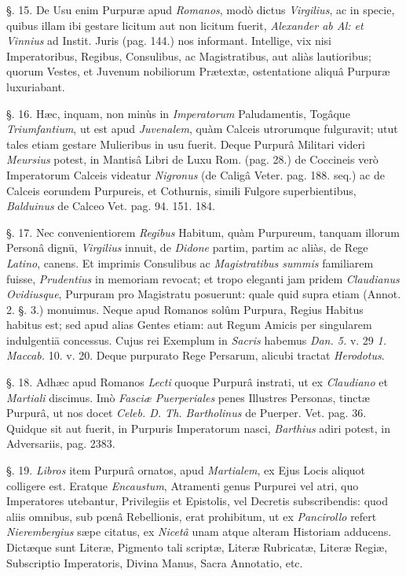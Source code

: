 \documentclass[a4paper, 11pt, oneside, polutonikogreek, german]{article}
\begin{document}
§. 15. De Usu enim Purpuræ apud \emph{Romanos}, modò dictus \emph{Virgilius}, ac in specie, quibus illam ibi gestare licitum aut non licitum fuerit, \emph{Alexander ab Al: et Vinnius} ad Instit. Juris (pag. 144.) nos informant. Intellige, vix nisi Imperatoribus, Regibus, Consulibus, ac Magistratibus, aut aliàs lautioribus; quorum Vestes, et Juvenum nobiliorum Prætextæ, ostentatione aliquâ Purpuræ luxuriabant.

§. 16. Hæc, inquam, non minùs in \emph{Imperatorum} Paludamentis, Togâque \emph{Triumfantium}, ut est apud \emph{Juvenalem}, quàm Calceis utrorumque fulguravit; utut tales etiam gestare Mulieribus in usu fuerit. Deque Purpurâ Militari videri \emph{Meursius} potest, in Mantisâ Libri de Luxu Rom. (pag. 28.) de Coccineis verò Imperatorum Calceis videatur \emph{Nigronus} (de Caligâ Veter. pag. 188. seq.) ac de Calceis eorundem Purpureis, et Cothurnis, simili Fulgore superbientibus, \emph{Balduinus} de Calceo Vet. pag. 94. 151. 184.

§. 17. Nec convenientiorem \emph{Regibus} Habitum, quàm Purpureum, tanquam illorum Personâ dignū, \emph{Virgilius} innuit, de \emph{Didone} partim, partim ac aliàs, de Rege \emph{Latino}, canens. Et imprimis Consulibus ac \emph{Magistratibus summis} familiarem fuisse, \emph{Prudentius} in memoriam revocat; et tropo eleganti jam pridem \emph{Claudianus Ovidiusque}, Purpuram pro Magistratu posuerunt: quale quid supra etiam (Annot. 2. §. 3.) monuimus. Neque apud Romanos solûm Purpura, Regius Habitus habitus est; sed apud alias Gentes etiam: aut Regum Amicis per singularem indulgentiā concessus. Cujus rei Exemplum in \emph{Sacris} habemus \emph{Dan. 5.} v. 29 \emph{1. Maccab.} 10. v. 20. Deque purpurato Rege Persarum, alicubi tractat \emph{Herodotus}.

§. 18. Adhæc apud Romanos \emph{Lecti} quoque Purpurâ instrati, ut ex \emph{Claudiano} et \emph{Martiali} discimus. Imò \emph{Fasciæ Puerperiales} penes Illustres Personas, tinctæ Purpurâ, ut nos docet \emph{Celeb. D. Th. Bartholinus} de Puerper. Vet. pag. 36. Quidque sit aut fuerit, in Purpuris Imperatorum nasci, \emph{Barthius} adiri potest, in Adversariis, pag. 2383.

§. 19. \emph{Libros} item Purpurâ ornatos, apud \emph{Martialem}, ex Ejus Locis aliquot colligere est. Eratque \emph{Encaustum}, Atramenti genus Purpurei vel atri, quo Imperatores utebantur, Privilegiis et Epistolis, vel Decretis subscribendis: quod aliis omnibus, sub pœnâ Rebellionis, erat prohibitum, ut ex \emph{Pancirollo} refert \emph{Nierembergius} sæpe citatus, ex \emph{Nicetâ} unam atque alteram Historiam adducens. Dictæque sunt Literæ, Pigmento tali scriptæ, Literæ Rubricatæ, Literæ Regiæ, Subscriptio Imperatoris, Divina Manus, Sacra Annotatio, etc.
\end{document}
